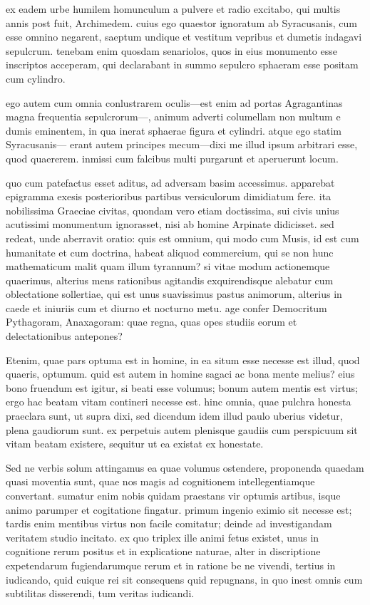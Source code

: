  ex eadem urbe humilem homunculum a pulvere et radio excitabo, qui multis annis post fuit, Archimedem. cuius ego quaestor ignoratum ab Syracusanis, cum esse omnino negarent, saeptum undique et vestitum vepribus et dumetis indagavi sepulcrum. tenebam enim quosdam senariolos, quos in eius monumento esse inscriptos acceperam, qui declarabant in summo sepulcro sphaeram esse positam cum cylindro.

 ego autem cum omnia conlustrarem oculis—est enim ad portas Agragantinas magna frequentia sepulcrorum—, animum adverti columellam non multum e dumis eminentem, in qua inerat sphaerae figura et cylindri. atque ego statim Syracusanis— erant autem principes mecum—dixi me illud ipsum arbitrari esse, quod quaererem. inmissi cum falcibus multi purgarunt et aperuerunt locum.

 quo cum patefactus esset aditus, ad adversam basim accessimus. apparebat epigramma exesis posterioribus partibus versiculorum dimidiatum fere. ita nobilissima Graeciae civitas, quondam vero etiam doctissima, sui civis unius acutissimi monumentum ignorasset, nisi ab homine Arpinate didicisset. sed redeat, unde aberravit oratio: quis est omnium, qui modo cum Musis, id est cum humanitate et cum doctrina, habeat aliquod commercium, qui se non hunc mathematicum malit quam illum tyrannum? si vitae modum actionemque quaerimus, alterius mens rationibus agitandis exquirendisque alebatur cum oblectatione sollertiae, qui est unus suavissimus pastus animorum, alterius in caede et iniuriis cum et diurno et nocturno metu. age confer Democritum Pythagoram, Anaxagoram: quae regna, quas opes studiis eorum et delectationibus antepones?

 Etenim, quae pars optuma est in homine, in ea situm esse necesse est illud, quod quaeris, optumum. quid est autem in homine sagaci ac bona mente melius? eius bono fruendum est igitur, si beati esse volumus; bonum autem mentis est virtus; ergo hac beatam vitam contineri necesse est. hinc omnia, quae pulchra honesta praeclara sunt, ut supra dixi, sed dicendum idem illud paulo uberius videtur, plena gaudiorum sunt. ex perpetuis autem plenisque gaudiis cum perspicuum sit vitam beatam existere, sequitur ut ea existat ex honestate.

 Sed ne verbis solum attingamus ea quae volumus ostendere, proponenda quaedam quasi moventia sunt, quae nos magis ad cognitionem intellegentiamque convertant. sumatur enim nobis quidam praestans vir optumis artibus, isque animo parumper et cogitatione fingatur. primum ingenio eximio sit necesse est; tardis enim mentibus virtus non facile comitatur; deinde ad investigandam veritatem studio incitato. ex quo triplex ille animi fetus existet, unus in cognitione rerum positus et in explicatione naturae, alter in discriptione expetendarum fugiendarumque rerum et in ratione be ne vivendi, tertius in iudicando, quid cuique rei sit consequens quid repugnans, in quo inest omnis cum subtilitas disserendi, tum veritas iudicandi.

